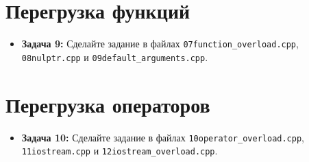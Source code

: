 \documentclass{article}
\begin{document}
\section*{Перегрузка функций}
\begin{itemize}
\item \textbf{Задача 9:} Сделайте задание в файлах \texttt{07function\_overload.cpp}, \texttt{08nulptr.cpp} и \texttt{09default\_arguments.cpp}.
\end{itemize}
\section*{Перегрузка операторов}
\begin{itemize}
\item \textbf{Задача 10:} Сделайте задание в файлах \texttt{10operator\_overload.cpp}, \texttt{11iostream.cpp} и \texttt{12iostream\_overload.cpp}.
\end{itemize}
\end{document}
